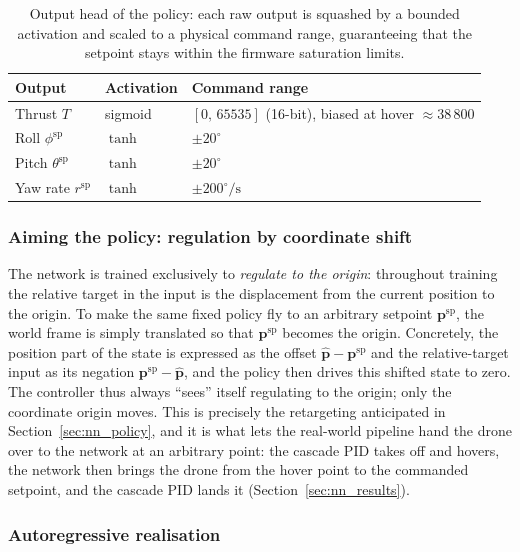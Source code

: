 \documentclass[11pt,a4paper]{article}
\theoremstyle{remark}
\numberwithin{equation}{section}
\begin{document}
\begin{table}[h]
    \centering
    \caption{Output head of the policy: each raw output is squashed by a bounded
    activation and scaled to a physical command range, guaranteeing that the
    setpoint stays within the firmware saturation limits.}
    \label{tab:nn_outputs}
    \small
    \begin{tabular}{l l l}
        \toprule
        Output & Activation & Command range \\
        \midrule
        Thrust $T$            & sigmoid & $[0,\,65535]$ (16-bit), biased at hover $\approx 38\,800$ \\
        Roll $\phi^{\mathrm{sp}}$    & $\tanh$ & $\pm 20^\circ$ \\
        Pitch $\theta^{\mathrm{sp}}$ & $\tanh$ & $\pm 20^\circ$ \\
        Yaw rate $r^{\mathrm{sp}}$   & $\tanh$ & $\pm 200^\circ/\mathrm{s}$ \\
        \bottomrule
    \end{tabular}
\end{table}

\subsubsection*{Aiming the policy: regulation by coordinate shift}

The network is trained exclusively to \emph{regulate to the origin}: throughout
training the relative target in the input is the displacement from the current
position to the origin. To make the same fixed policy fly to an arbitrary
setpoint $\mathbf{p}^{\mathrm{sp}}$, the world frame is simply translated so that
$\mathbf{p}^{\mathrm{sp}}$ becomes the origin. Concretely, the position part of
the state is expressed as the offset $\hat{\mathbf{p}} - \mathbf{p}^{\mathrm{sp}}$
and the relative-target input as its negation
$\mathbf{p}^{\mathrm{sp}} - \hat{\mathbf{p}}$, and the policy then drives this
shifted state to zero. The controller thus always ``sees'' itself regulating to
the origin; only the coordinate origin moves. This is precisely the retargeting
anticipated in Section~\ref{sec:nn_policy}, and it is what lets the real-world
pipeline hand the drone over to the network at an arbitrary point: the cascade
PID takes off and hovers, the network then brings the drone from the hover point
to the commanded setpoint, and the cascade PID lands it
(Section~\ref{sec:nn_results}).

\subsubsection*{Autoregressive realisation}
\end{document}
